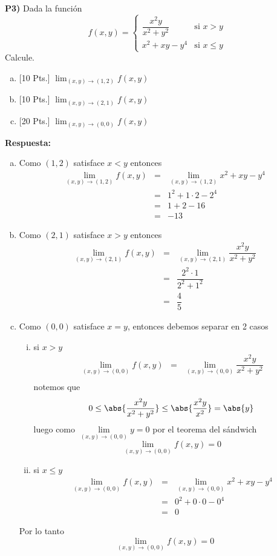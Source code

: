 \documentclass{article}
\begin{document}
\newpage
\noindent\textbf{P3) } Dada la función
$$f(x,y) =\begin{cases}
  \dfrac{x^2y}{x^2+y^2} & \text{si } x>y\\
  x^2+xy-y^4 & \text{si } x\leq y
\end{cases}$$
Calcule.
\begin{enumerate}[a)]
  \item \textsf{[10 Pts.] } $\displaystyle\lim_{(x,y)\to(1,2)}f(x,y)$
  \item \textsf{[10 Pts.] }$\displaystyle\lim_{(x,y)\to(2,1)}f(x,y)$
  \item \textsf{[20 Pts.] }$\displaystyle\lim_{(x,y)\to(0,0)}f(x,y)$
\end{enumerate}

\vspace{0.25cm}
\noindent\textbf{Respuesta:} 
\begin{enumerate}[a)]
  \item Como $(1,2)$ satisface $x<y$ entonces
    \begin{eqnarray*}
      \lim_{(x,y)\to(1,2)}f(x,y) &=& \lim_{(x,y)\to(1,2)} x^2+xy-y^4\\
        &=& 1^2+1\cdot 2 - 2^4\\
        &=& 1+2-16\\
        &=& -13
    \end{eqnarray*}
  \item Como $(2,1)$ satisface $x>y$ entonces
    \begin{eqnarray*}
      \lim_{(x,y)\to(2,1)}f(x,y) &=& \lim_{(x,y)\to(2,1)} \dfrac{x^2y}{x^2+y^2}\\
        &=& \dfrac{2^2\cdot 1}{2^2+1^2}\\
        &=& \dfrac{4}{5}
    \end{eqnarray*}
  \item Como $(0,0)$ satisface $x=y$, entonces debemos separar en 2 casos
    \begin{enumerate}[i)]
      \item si $x>y$
        \begin{eqnarray*}
          \lim_{(x,y)\to(0,0)}f(x,y) &=& \lim_{(x,y)\to(0,0)} \dfrac{x^2y}{x^2+y^2}\\
        \end{eqnarray*}
        notemos que
          $$0 \leq \abs{\dfrac{x^2y}{x^2+y^2}}\leq \abs{\dfrac{x^2y}{x^2}} = \abs{y}$$
        luego como $\lim\limits_{(x,y)\to(0,0)}y=0$ por el teorema del sándwich
          $$\lim_{(x,y)\to(0,0)}f(x,y) = 0$$
      \item si $x\leq y$
        \begin{eqnarray*}
          \lim_{(x,y)\to(0,0)}f(x,y) &=& \lim_{(x,y)\to(0,0)} x^2+xy-y^4\\
            &=& 0^2+0\cdot 0 - 0^4\\
            &=& 0
        \end{eqnarray*}
    \end{enumerate}
    Por lo tanto
      $$\lim_{(x,y)\to(0,0)}f(x,y) = 0$$
\end{enumerate}
\end{document}
